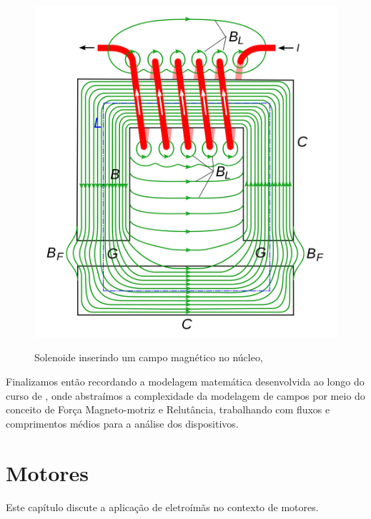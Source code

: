 \documentclass[
        12pt,                           %
        openright,                      %
        twoside,                        %
        a4paper,                        %
        english,                        %
        french,                         %
        spanish,                        %
        brazil                          %
        ]{abntex2}
\begin{document}
\begin{figure}[!htp]
  \centering
  \includegraphics[width=0.7\columnwidth]{Electromagnet_with_gap.svg.png}
  \label{fig:chap:embasamento:6}
  \caption{Solenoide inserindo um campo magnético no núcleo, \cite{web:wikipedia:electromagnet}}
\end{figure}

Finalizamos então recordando a modelagem matemática desenvolvida ao longo do
curso de \cite{book:fitzgerald}, onde abstraímos a complexidade da modelagem de campos
por meio do conceito de Força Magneto-motriz e Relutância, trabalhando com fluxos e
comprimentos médios para a análise dos dispositivos.

\chapter{Motores}\label{chap:Motores}
Este capítulo discute a aplicação de eletroímãs no contexto de motores.


\end{document}
